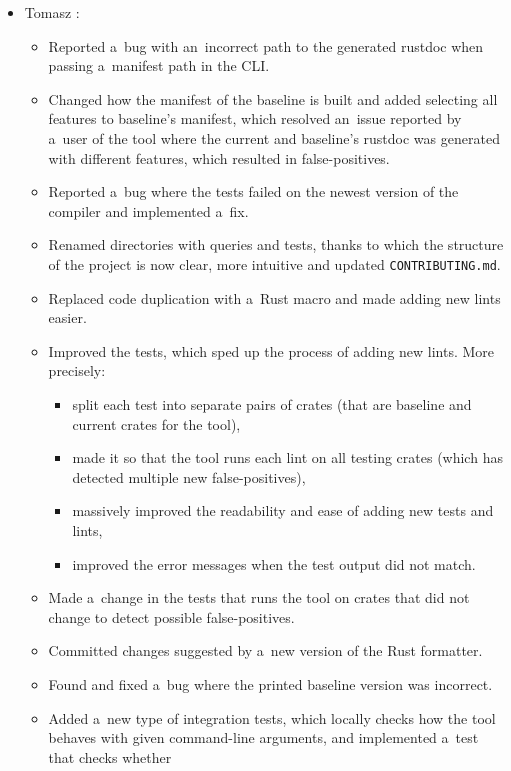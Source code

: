 \documentclass[licencjacka,en]{pracamgr}
\begin{document}
\begin{itemize}
	\item Tomasz \cite{responsibilities-tomasz}:
		\begin{itemize}
			\item Reported a~bug with an~incorrect path to the generated rustdoc when passing
				a~manifest path in the CLI.
			\item Changed how the manifest of the baseline is built and added selecting all
				features to baseline's manifest, which resolved an~issue reported by a~user of
				the tool where the current and baseline's rustdoc was generated with different
				features, which resulted in false-positives.
			\item Reported a~bug where the tests failed on the newest version of the compiler
				and implemented a~fix.
			\item Renamed directories with queries and tests, thanks to which the structure of
				the project is now clear, more intuitive and updated \texttt{CONTRIBUTING.md}.
			\item Replaced code duplication with a~Rust macro and made adding new lints easier.
			\item Improved the tests, which sped up the process of adding new lints.
				More precisely:
				\begin{itemize}
					\item split each test into separate pairs of crates (that are baseline
						and current crates for the tool),
					\item made it so that the tool runs each lint on all testing crates
						(which has detected multiple new false-positives),
					\item massively improved the readability and ease of adding new tests
						and lints,
					\item improved the error messages when the test output did not match.
				\end{itemize}
			\item Made a~change in the tests that runs the tool on crates that did not change
				to detect possible false-positives.
			\item Committed changes suggested by a~new version of the Rust formatter.
			\item Found and fixed a~bug where the printed baseline version was incorrect.
			\item Added a~new type of integration tests, which locally checks how the tool behaves
				with given command-line arguments, and implemented a~test that checks whether

\end{itemize}
\end{itemize}
\end{document}
